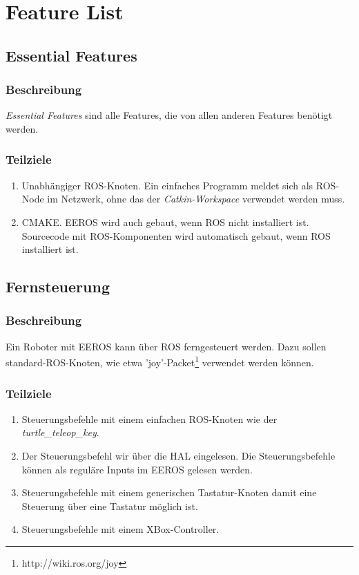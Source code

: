 \chapter{Feature List}


\section{Essential Features}
\subsection{Beschreibung}
\textit{Essential Features} sind alle Features, die von allen anderen Features benötigt werden.

\subsection{Teilziele}
\begin{enumerate}
\item Unabhängiger ROS-Knoten. Ein einfaches Programm meldet sich als ROS-Node im Netzwerk, ohne das der \textit{Catkin-Workspace} verwendet werden muss.
\item CMAKE. EEROS wird auch gebaut, wenn ROS nicht installiert ist. Sourcecode mit ROS-Komponenten wird automatisch gebaut, wenn ROS installiert ist.
\end{enumerate}


\section{Fernsteuerung}
\subsection{Beschreibung}
Ein Roboter mit EEROS kann über ROS ferngesteuert werden.
Dazu sollen standard-ROS-Knoten, wie etwa 'joy'-Packet\footnote{http://wiki.ros.org/joy} verwendet werden können.

\subsection{Teilziele}
\begin{enumerate}
\item Steuerungsbefehle mit einem einfachen ROS-Knoten wie der \textit{turtle\_teleop\_key}.
\item Der Steuerungsbefehl wir über die HAL eingelesen. Die Steuerungsbefehle können als reguläre Inputs im EEROS gelesen werden.
\item Steuerungsbefehle mit einem generischen Tastatur-Knoten damit eine Steuerung über eine Tastatur möglich ist.
\item Steuerungsbefehle mit einem XBox-Controller.
\end{enumerate}


